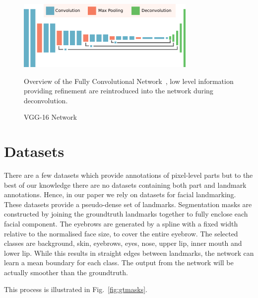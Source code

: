 \begin{figure}
\includegraphics[width=\linewidth]{figs/FCN.pdf}
\caption{VGG-16 Network}{Overview of the
  Fully Convolutional Network~\cite{long2015fully}, low level
  information providing refinement are reintroduced into the network
  during deconvolution.}
\label{fig:fcn}
\end{figure}

\section{Datasets}
\label{sec:dataset}

There are a few datasets which provide annotations of pixel-level
parts \cite{bo2011shape,kae2013augmenting,chen2014detect} but to the
best of our knowledge there are no datasets containing both part and
landmark annotations. Hence, in our paper we rely on datasets for
facial landmarking. These datasets provide a pseudo-dense set of
landmarks. Segmentation masks are constructed by joining the
groundtruth landmarks together to fully enclose each facial
component. The eyebrows are generated by a spline with a fixed width
relative to the normalised face size, to cover the entire eyebrow. The
selected classes are background, skin, eyebrows, eyes, nose, upper
lip, inner mouth and lower lip. While this results in straight edges
between landmarks, the network can learn a mean boundary for each
class. The output from the network will be actually smoother than the
groundtruth.

This process is illustrated in Fig.~\ref{fig:gtmasks}.

